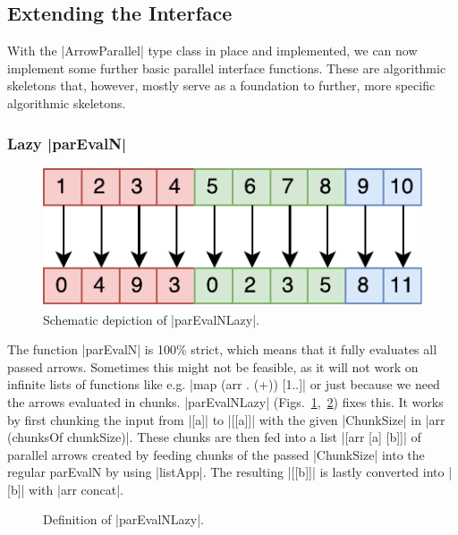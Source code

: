 \subsection{Extending the Interface}
\label{sec:extending-interface}
With the |ArrowParallel| type class in place and implemented, we can now implement some further basic parallel interface functions. These are algorithmic skeletons that, however, mostly serve as a foundation to further, more specific algorithmic skeletons.

\subsubsection{Lazy |parEvalN|}
\begin{figure}[tb]
	\includegraphics[scale=0.7]{images/parEvalNLazy}
	\caption{Schematic depiction of |parEvalNLazy|.}
	\label{fig:parEvalNLazyImg}
\end{figure}
The function |parEvalN| is 100\% strict, which means that it fully evaluates all passed arrows. Sometimes this might not be feasible, as it will not work on infinite lists of functions like e.g. |map (arr . (+)) [1..]| or just because we need the arrows evaluated in chunks. |parEvalNLazy| (Figs.~\ref{fig:parEvalNLazyImg},~\ref{fig:parEvalNLazy}) fixes this. It works by first chunking the input from |[a]| to |[[a]]| with the given |ChunkSize| in |arr (chunksOf chunkSize)|. These chunks are then fed into a list |[arr [a] [b]]| of parallel arrows created by feeding chunks of the passed |ChunkSize| into the regular parEvalN by using |listApp|. The resulting |[[b]]| is lastly converted into |[b]| with |arr concat|.
\begin{figure}[t]
\caption{Definition of |parEvalNLazy|.}
\label{fig:parEvalNLazy}
\end{figure}

